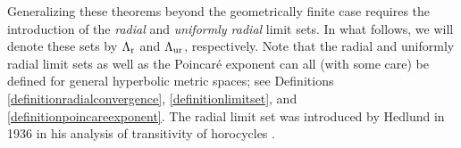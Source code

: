



Generalizing these theorems beyond the geometrically finite case requires the introduction of the \emph{radial} and \emph{uniformly radial} limit sets. In what follows, we will denote these sets by $\Lambda_{\mathrm r}$ and $\Lambda_{\mathrm{ur}}$, respectively. Note that the radial and uniformly radial limit sets as well as the Poincar\'e exponent can all (with some care) be defined for general hyperbolic metric spaces; see Definitions \ref{definitionradialconvergence}, \ref{definitionlimitset}, and \ref{definitionpoincareexponent}. The radial limit set was introduced by Hedlund in 1936 in his analysis of transitivity of horocycles \cite[Theorem 2.4]{Hedlund}.

